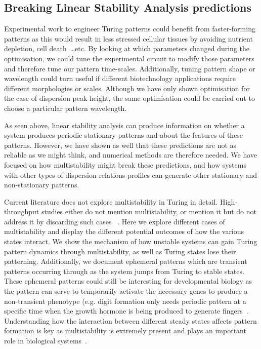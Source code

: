 \subsection*{Breaking Linear Stability Analysis predictions}
Experimental work to engineer Turing patterns could benefit from faster-forming patterns as this would result in less stressed cellular tissues by avoiding nutrient depletion, cell death~\ldots etc.
By looking at which parameters changed during the optimisation, we could tune the experimental circuit to modify those parameters and therefore tune our pattern time-scales.
Additionally, tuning pattern shape or wavelength could turn useful if different biotechnology applications require different morphologies or scales.
Although we have only shown optimisation for the case of dispersion peak height, the same optimisation could be carried out to choose a particular pattern wavelength.

As seen above, linear stability analysis can produce information on whether a system produces periodic stationary patterns and about the features of these patterns.
However, we have shown as well that these predictions are not as reliable as we might think, and numerical methods are therefore needed.
We have focused on how multistability might break these predictions, and how systems with other types of dispersion relations profiles can generate other stationary and non-stationary patterns.

Current literature does not explore multistability in Turing in detail.
High-throughput studies either do not mention multistability, or mention it but do not address it by discarding such cases ~\parencite{Scholes2019, Marcon, Zheng2016}.
Here we explore different cases of multistability and display the different potential outcomes of how the various states interact.
We show the mechanism of how unstable systems can gain Turing pattern dynamics through multistability, as well as Turing states lose their patterning.
Additionally, we document ephemeral patterns which are transient patterns occurring through as the system jumps from Turing to stable states.
These ephemeral patterns could still be interesting for developmental biology as the pattern can serve to temporarily activate the necessary genes to produce a non-transient phenotype (e.g. digit formation only needs periodic pattern at a specific time when the growth hormone is being produced to generate fingers~\parencite{Raspopovic1}.
Understanding how the interaction between different steady states affects pattern formation is key as multistability is extremely present and plays an important role in biological systems~\parencite{laurent1999multistability}.

